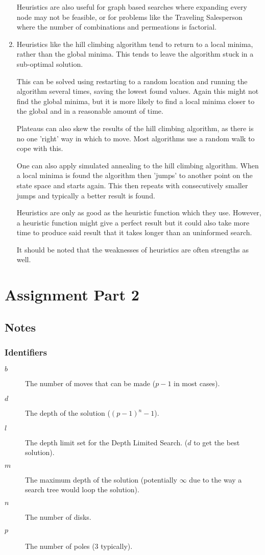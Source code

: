 \documentclass[10pt,letterpaper]{article}
\begin{document}
\begin{enumerate}
      Heuristics are also useful for graph based searches where expanding every node may not be feasible, or for problems like the Traveling Salesperson where the number of combinations and permeations is factorial.
  
    \item
      Heuristics like the hill climbing algorithm tend to return to a local minima, rather than the global minima. This tends to leave the algorithm stuck in a sub-optimal solution.
      
      This can be solved using restarting to a random location and running the algorithm several times, saving the lowest found values. Again this might not find the global minima, but it is more likely to find a local minima closer to the global and in a reasonable amount of time.
      
      Plateaus can also skew the results of the hill climbing algorithm, as there is no one 'right' way in which to move. Most algorithms use a random walk to cope with this.
      
      One can also apply simulated annealing to the hill climbing algorithm. When a local minima is found the algorithm then 'jumps' to another point on the state space and starts again. This then repeats with consecutively smaller jumps and typically a better result is found.
      
      Heuristics are only as good as the heuristic function which they use. However, a heuristic function might give a perfect result but it could also take more time to produce said result that it takes longer than an uninformed search.
  
      It should be noted that the weaknesses of heuristics are often strengths as well.
  \end{enumerate}
  
  \newpage
  \section{Assignment Part 2}
  
    \subsection{Notes}
      \subsubsection{Identifiers}
	\begin{description}
	  \item[\(b\)] The number of moves that can be made (\(p-1\) in most cases).
	  \item[\(d\)] The depth of the solution (\((p-1)^n-1\)).
	  \item[\(l\)] The depth limit set for the Depth Limited Search. (\(d\) to get the best solution).
	  \item[\(m\)] The maximum depth of the solution (potentially \(\infty\) due to the way a search tree would loop the solution).
	  \item[\(n\)] The number of disks.
	  \item[\(p\)] The number of poles (3 typically).
	\end{description}
\end{document}
